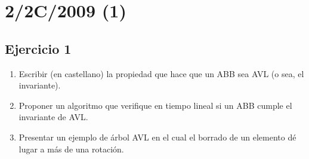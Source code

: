 \documentclass[10pt, a4paper]{article}
\begin{document}
% 
% 
% 

% 
% 

\section{2/2C/2009 (1)}

\subsection*{Ejercicio 1}

\begin{enumerate}
 \item Escribir (en castellano) la propiedad que hace que un ABB sea AVL (o sea, el invariante).
 \item Proponer un algoritmo que verifique en tiempo lineal si un ABB cumple el invariante de AVL.
 \item Presentar un ejemplo de \'arbol AVL en el cual el borrado de un elemento dé lugar a más de una rotaci\'on.
\end{enumerate}
\end{document}
